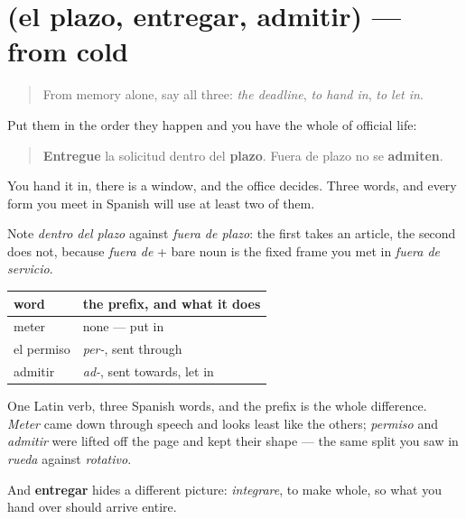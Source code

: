 \section[(el plazo, entregar, admitir)]{(el plazo, entregar, admitir) — from cold}

\label{lesson:ES-R458-repaso-plazo}



\begin{quote}
From memory alone, say all three: \emph{the deadline}, \emph{to hand in}, \emph{to let in}.
\end{quote}

\begin{grammarlens}[title={Grammar Lens: the three of them are one sentence}]
Put them in the order they happen and you have the whole of official life:

\begin{quote}
\textbf{Entregue} la solicitud dentro del \textbf{plazo}. Fuera de plazo no se \textbf{admiten}.
\end{quote}

You hand it in, there is a window, and the office decides. Three words, and every form you meet in Spanish will use at least two of them.

Note \emph{dentro del plazo} against \emph{fuera de plazo}: the first takes an article, the second does not, because \emph{fuera de} + bare noun is the fixed frame you met in \emph{fuera de servicio}.
\end{grammarlens}

\begin{grammarlens}[title={Grammar Lens: mittere, for the third time}]
\noindent
\begin{tabularx}{\linewidth}{@{}>{\raggedright\arraybackslash}X>{\raggedright\arraybackslash}X@{}}
\toprule
\textbf{word} & \textbf{the prefix, and what it does} \\
\midrule
meter & none — put in \\
el permiso & \emph{per-}, sent through \\
admitir & \emph{ad-}, sent towards, let in \\
\bottomrule
\end{tabularx}

One Latin verb, three Spanish words, and the prefix is the whole difference. \emph{Meter} came down through speech and looks least like the others; \emph{permiso} and \emph{admitir} were lifted off the page and kept their shape — the same split you saw in \emph{rueda} against \emph{rotativo}.

And \textbf{entregar} hides a different picture: \emph{integrare}, to make whole, so what you hand over should arrive entire.
\end{grammarlens}

